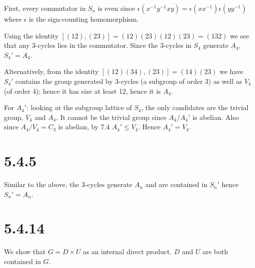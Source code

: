 \documentclass{article}
\def\inv{{-1}}
\begin{document}
First, every commutator in $S_n$ is even since $\epsilon(x^\inv y^\inv x y) = \epsilon(xx^\inv) \epsilon(yy^\inv)$ where $\epsilon$ is the sign-counting homomorphism.

Using the identity $[(12),(23)] = (12)(23)(12)(23) = (132)$ we see that any 3-cycles lies in the commutator. Since the 3-cycles in $S_4$ generate $A_4$, $S_4' = A_4$.

Alternatively, from the identity $[(12)(34),(23)] = (14)(23)$ we have $S_4'$ contains the group generated by 3-cycles (a subgroup of order 3) as well as $V_4$ (of order 4); hence it has size at least 12, hence it is $A_4$.

For $A_4'$: looking at the subgroup lattice of $S_4$, the only candidates are the trivial group, $V_4$ and $A_4$. It cannot be the trivial group since $A_4 / A_4'$ is abelian. Also since $A_4 / V_4 = C_3$ is abelian, by 7.4 $A_4' \le V_4$. Hence $A_4' = V_4$.

\section*{5.4.5}

Similar to the above, the 3-cycles generate $A_n$ and are contained in $S_n'$ hence $S_n' = A_n$.

\section*{5.4.14}

We show that $G = D \times U$ as an internal direct product. $D$ and $U$ are both contained in $G$.

\end{document}
